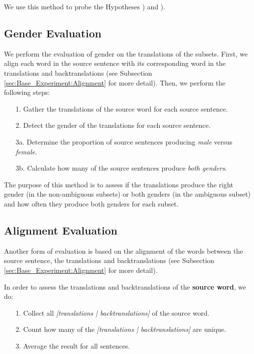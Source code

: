 We use this method to probe the Hypotheses ) and ). 

\subsection{Gender Evaluation}
\label{sec:Base_Experiment:Statistics:Gender}
We perform the evaluation of gender on the translations of the subsets.  First, we align each word in the source sentence with its corresponding word in the translations and backtranslations (see Subsection \ref{sec:Base_Experiment:Alignment} for more detail). Then, we perform the following steps:

\begin{enumerate}
    \item[1. ] Gather the translations of the source word for each source sentence.
    \item[2. ] Detect the gender of the translations for each source sentence.
    \item[3a. ] Determine the proportion of source sentences producing \textit{male} versus \textit{female}.
    \item[3b. ] Calculate how many of the source sentences produce \textit{both genders}. 
\end{enumerate}

The purpose of this method is to assess if the translations produce the right gender (in the non-ambiguous subsets) or both genders (in the ambiguous subset) and how often they produce both genders for each subset.

\subsection{Alignment Evaluation}
\label{sec:Base_Experiment:Statistics:Alignment}
Another form of evaluation is based on the alignment of the words between the source sentence, the translations and backtranslations (see Subsection \ref{sec:Base_Experiment:Alignment} for more detail).

In order to assess the translations and backtranslations of the \textbf{source word}, we do:
\begin{enumerate}
    \item[1. ] Collect all \textit{[translations | backtranslations]} of the source word.
    \item[2. ] Count how many of the \textit{[translations | backtranslations]} are unique.
    \item[3. ] Average the result for all sentences.
\end{enumerate}

